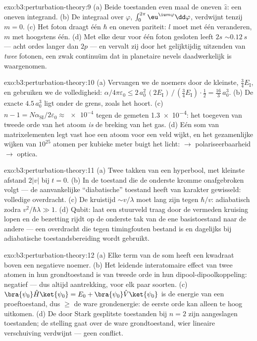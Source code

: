 \begin{solution}{exo:b3:perturbation-theory:9}
(a) Beide toestanden even maal de oneven $\hat z$: een oneven integrand.
(b) De integraal over $\varphi$, $\int_0^{2\pi}\eu^{\iu m\varphi}\dd\varphi$, verdwijnt tenzij $m = 0$. (c) Het foton draagt één $\hbar$
en oneven pariteit: $l$ moet met één veranderen, $m$ met hoogstens één.
(d) Met elke deur voor één foton gesloten leeft $2s$
$\sim\qty{0.12}{s}$ --- acht ordes langer dan $2p$ --- en vervalt zij door
het gelijktijdig uitzenden van \emph{twee} fotonen, een zwak continuüm dat
in planetaire nevels daadwerkelijk is waargenomen.
\end{solution}

\begin{solution}{exo:b3:perturbation-theory:10}
(a) Vervangen we de noemers door de kleinste, $\tfrac34
E_{\text{I}}$, en gebruiken we de volledigheid: $\alpha/4\pi\varepsilon_0 \le
2\,a_0^2\,(2E_{\text{I}})\,/\,(\tfrac34 E_{\text{I}})\cdot\tfrac12
= \tfrac{16}3\,a_0^3$. (b) De exacte $4.5\,a_0^3$ ligt onder de grens,
zoals het hoort. (c) $n - 1 = N\alpha_{\text{SI}}/2\varepsilon_0
\approx \num{e-4}$ tegen de gemeten \num{1.3e-4}: het toegeven van tweede
orde van het atoom \emph{is} de breking van het gas. (d) Eén som van
matrixelementen legt vast hoe een atoom voor een veld wijkt, en het
gezamenlijke wijken van $10^{25}$ atomen per kubieke meter buigt het licht:
 $\to$ polariseerbaarheid $\to$ optica.
\end{solution}

\begin{solution}{exo:b3:perturbation-theory:11}
(a) Twee takken van een hyperbool, met kleinste afstand $2|v|$ bij $t = 0$.
(b) In de toestand die de onderste kromme onafgebroken volgt --- de
aanvankelijke ``diabatische'' toestand heeft van karakter gewisseld:
volledige overdracht. (c) De kruistijd $\sim v/\lambda$ moet lang zijn
tegen $\hbar/v$: adiabatisch zodra $v^2/\hbar\lambda \gg 1$. (d) Qubit:
laat een stuurveld traag door de vermeden kruising lopen en de bezetting
rijdt op de onderste tak van de ene basistoestand naar de andere --- een
overdracht die tegen timingfouten bestand is en dagelijks bij adiabatische
toestandsbereiding wordt gebruikt.
\end{solution}

\begin{solution}{exo:b3:perturbation-theory:12}
(a) Elke term van de som heeft een kwadraat boven een negatieve noemer.
(b) Het leidende interatomaire effect van twee atomen in hun grondtoestand
is van tweede orde in hun dipool-dipoolkoppeling: negatief --- dus altijd
aantrekking, voor elk paar soorten. (c) $\bra{\psi_0}\hat H\ket{
\psi_0} = E_0 + \bra{\psi_0}\hat V\ket{\psi_0}$ is de energie van een
proeftoestand, dus $\ge$ de ware grondenergie: de eerste orde kan alleen
te hoog uitkomen. (d) De door Stark gesplitste toestanden bij $n = 2$ zijn
aangeslagen toestanden; de stelling gaat over de ware grondtoestand, wier
lineaire verschuiving verdwijnt --- geen conflict.
\end{solution}

